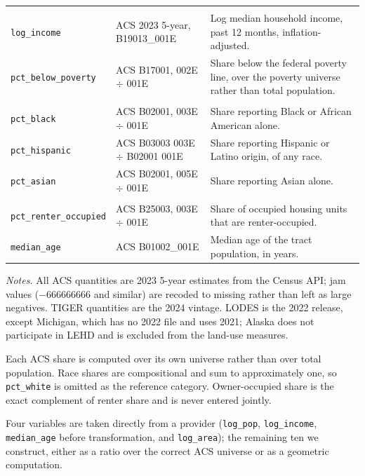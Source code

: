 \begin{table}[htbp]
\begin{tabular}{@{}
  >{\raggedright\arraybackslash}p{}
  >{\raggedright\arraybackslash}p{}
  >{\raggedright\arraybackslash}p{}@{}}
\multicolumn{3}{@{}l}{\textit{Economic}} \\
\texttt{log\_income} &
ACS 2023 5-year, B19013\_001E &
Log median household income, past 12 months, inflation-adjusted. \\
\texttt{pct\_below\_poverty} &
ACS B17001, 002E $\div$ 001E &
Share below the federal poverty line, over the poverty universe rather than total population. \\
\addlinespace

\multicolumn{3}{@{}l}{\textit{Composition (White alone is the omitted reference)}} \\
\texttt{pct\_black} &
ACS B02001, 003E $\div$ 001E &
Share reporting Black or African American alone. \\
\texttt{pct\_hispanic} &
ACS B03003 003E $\div$ B02001 001E &
Share reporting Hispanic or Latino origin, of any race. \\
\texttt{pct\_asian} &
ACS B02001, 005E $\div$ 001E &
Share reporting Asian alone. \\
\addlinespace

\multicolumn{3}{@{}l}{\textit{Other}} \\
\texttt{pct\_renter\_occupied} &
ACS B25003, 003E $\div$ 001E &
Share of occupied housing units that are renter-occupied. \\
\texttt{median\_age} &
ACS B01002\_001E &
Median age of the tract population, in years. \\
\bottomrule
\end{tabular}

\vspace{0.6em}
\begin{minipage}{\textwidth}\footnotesize
\textit{Notes.} All ACS quantities are 2023 5-year estimates from the Census
API; jam values ($-666666666$ and similar) are recoded to missing rather than
left as large negatives. TIGER quantities are the 2024 vintage. LODES is the
2022 release, except Michigan, which has no 2022 file and uses 2021; Alaska
does not participate in LEHD and is excluded from the land-use measures.

Each ACS share is computed over its own universe rather than over total
population. Race shares are compositional and sum to approximately one, so
\texttt{pct\_white} is omitted as the reference category. Owner-occupied share
is the exact complement of renter share and is never entered jointly.

Four variables are taken directly from a provider (\texttt{log\_pop},
\texttt{log\_income}, \texttt{median\_age} before transformation, and
\texttt{log\_area}); the remaining ten we construct, either as a ratio over the
correct ACS universe or as a geometric computation.
\end{minipage}
\end{table}
